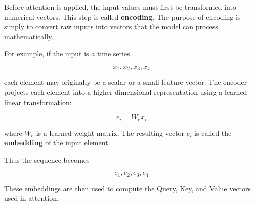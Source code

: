 \documentclass[a4paper]{article}
\title{}
\date{}
\begin{document}
    \maketitle
    Before attention is applied, the input values must first be transformed into numerical vectors. This step is called \textbf{encoding}. The purpose of encoding is simply to convert raw inputs into vectors that the model can process mathematically.

    For example, if the input is a time series
    
    \[
    x_1, x_2, x_3, x_4
    \]
    
    each element may originally be a scalar or a small feature vector. The encoder projects each element into a higher dimensional representation using a learned linear transformation:
    
    \[
    e_i = W_e x_i
    \]
    
    where \(W_e\) is a learned weight matrix. The resulting vector \(e_i\) is called the \textbf{embedding} of the input element.
    
    Thus the sequence becomes
    
    \[
    e_1, e_2, e_3, e_4
    \]
    
    These embeddings are then used to compute the Query, Key, and Value vectors used in attention.
    
    
    
    \section{}
\end{document}
